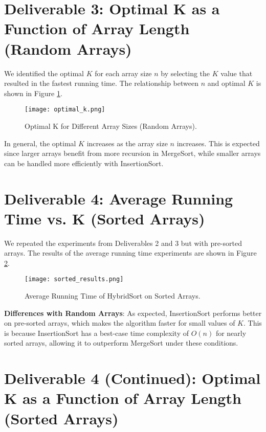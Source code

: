 \documentclass{article}
\begin{document}
	\section*{Deliverable 3: Optimal K as a Function of Array Length (Random Arrays)}
	
	We identified the optimal \( K \) for each array size \( n \) by selecting the \( K \) value that resulted in the fastest running time. The relationship between \( n \) and optimal \( K \) is shown in Figure \ref{fig:optimal_k}.
	
	\begin{figure}[h]
		\centering
		\texttt{[image: optimal\_k.png]}
		\caption{Optimal K for Different Array Sizes (Random Arrays).}
		\label{fig:optimal_k}
	\end{figure}
	
	In general, the optimal \( K \) increases as the array size \( n \) increases. This is expected since larger arrays benefit from more recursion in MergeSort, while smaller arrays can be handled more efficiently with InsertionSort.
	
	\section*{Deliverable 4: Average Running Time vs. K (Sorted Arrays)}
	
	We repeated the experiments from Deliverables 2 and 3 but with pre-sorted arrays. The results of the average running time experiments are shown in Figure \ref{fig:sorted}.
	
	\begin{figure}[h]
		\centering
		\texttt{[image: sorted\_results.png]}
		\caption{Average Running Time of HybridSort on Sorted Arrays.}
		\label{fig:sorted}
	\end{figure}
	
	\textbf{Differences with Random Arrays}: As expected, InsertionSort performs better on pre-sorted arrays, which makes the algorithm faster for small values of \( K \). This is because InsertionSort has a best-case time complexity of \( O(n) \) for nearly sorted arrays, allowing it to outperform MergeSort under these conditions.
	
	\section*{Deliverable 4 (Continued): Optimal K as a Function of Array Length (Sorted Arrays)}
	
\end{document}
